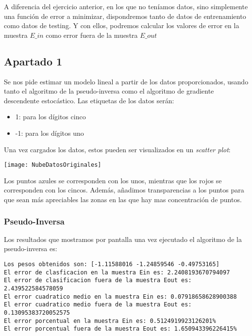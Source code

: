 \documentclass[11pt]{article}
\begin{document}
A diferencia del ejercicio anterior, en los que no teníamos datos, sino simplemente una función de error a minimizar, dispondremos tanto de datos de entrenamiento como datos de testing. Y con ellos, podremos calcular los valores de error en la muestra $E\_in$ como error fuera de la muestra $E\_out$

\subsection{Apartado 1}

Se nos pide estimar un modelo lineal a partir de los datos proporcionados, usando tanto el algoritmo de la pseudo-inversa como el algoritmo de gradiente descendente estocástico. Las etiquetas de los datos serán:

\begin{itemize}
    \item 1: para los dígitos cinco
    \item -1: para los dígitos uno
\end{itemize}

Una vez cargados los datos, estos pueden ser visualizados en un \emph{scatter plot}:

\begin{center}
\texttt{[image: NubeDatosOriginales]}
\end{center}

Los puntos azules se corresponden con los unos, mientras que los rojos se corresponden con los cincos. Además, añadimos transparencias a los puntos para que sean más apreciables las zonas en las que hay mas concentración de puntos.

\subsubsection{Pseudo-Inversa}

Los resultados que mostramos por pantalla una vez ejecutado el algoritmo de la pseudo-inversa es:

\begin{lstlisting}
Los pesos obtenidos son: [-1.11588016 -1.24859546 -0.49753165]
El error de clasficacion en la muestra Ein es: 2.2408193670794097
El error de clasificacion fuera de la muestra Eout es: 2.439522584578059
El error cuadratico medio en la muestra Ein es: 0.07918658628900388
El error cuadratico medio fuera de la muestra Eout es: 0.13095383720052575
El error porcentual en la muestra Ein es: 0.5124919923126201%
El error porcentual fuera de la muestra Eout es: 1.650943396226415%
\end{lstlisting}
\end{document}
